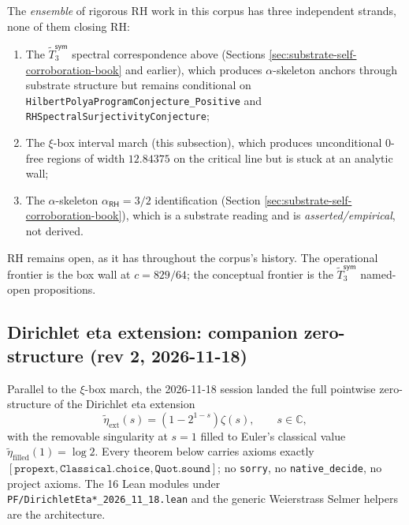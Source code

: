 The \emph{ensemble} of rigorous RH work in this corpus has three
independent strands, none of them closing RH:
\begin{enumerate}
\item The $\tilde{T}_3^{\textsf{sym}}$ spectral correspondence above
  (Sections \ref{sec:substrate-self-corroboration-book} and earlier),
  which produces $\alpha$-skeleton anchors through substrate structure
  but remains conditional on
  \texttt{HilbertPolyaProgramConjecture\_Positive} and
  \texttt{RHSpectralSurjectivityConjecture};
\item The $\xi$-box interval march (this subsection), which produces
  unconditional $0$-free regions of width $12.84375$ on the critical
  line but is stuck at an analytic wall;
\item The $\alpha$-skeleton $\alpha_{\textsf{RH}} = 3/2$ identification
  (Section \ref{sec:substrate-self-corroboration-book}), which is a
  substrate reading and is \emph{asserted/empirical}, not derived.
\end{enumerate}
RH remains open, as it has throughout the corpus's history.  The
operational frontier is the box wall at $c = 829/64$; the conceptual
frontier is the $\tilde{T}_3^{\textsf{sym}}$ named-open propositions.

\subsection{Dirichlet eta extension: companion zero-structure (rev 2, 2026-11-18)}
\label{sec:ch20-rev2-eta-structure}

Parallel to the $\xi$-box march, the 2026-11-18 session landed the
full pointwise zero-structure of the Dirichlet eta extension
\[
\widetilde{\eta}_{\mathrm{ext}}(s) = (1 - 2^{1-s}) \zeta(s),
\qquad s \in \mathbb{C},
\]
with the removable singularity at $s = 1$ filled to Euler's classical
value $\widetilde{\eta}_{\mathrm{filled}}(1) = \log 2$.  Every theorem
below carries axioms exactly
$[\mathtt{propext}, \mathtt{Classical.choice}, \mathtt{Quot.sound}]$;
no \texttt{sorry}, no \texttt{native\_decide}, no project axioms.
The 16 Lean modules under \texttt{PF/DirichletEta*\_2026\_11\_18.lean}
and the generic Weierstrass Selmer helpers are the architecture.

